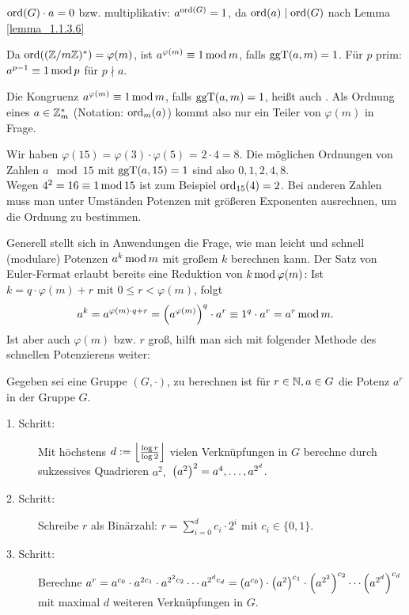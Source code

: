 \begin{folg}
	$\ord(G) \cdot a = 0$ bzw. multiplikativ: $a^{\ord(G)} = 1$, da $\ord(a) \mid \ord(G)$ nach Lemma \ref{lemma_1.1.3.6}
\end{folg}

\begin{folg}
	Da $\ord((\ZZ/m\ZZ)^*) = \varphi(m)$, ist $a^{\varphi(m)} \kon 1 \modu m$, falls $\ggT(a,m)=1$. Für $p$ prim: $a^{p-1} \kon 1 \modu p$ für $p \nmid a$. 
\end{folg}

\begin{bem}
	Die Kongruenz $a^{\varphi(m)} \kon 1 \modu m$, falls $\ggT(a,m)=1$, heißt auch . Als Ordnung eines $a \in \ZZ_m^*$ (Notation: $\ord_m(a)$) kommt also nur ein Teiler von $\varphi(m)$ in Frage.
\end{bem}

\begin{bsp}
	Wir haben $\varphi(15) = \varphi(3) \cdot \varphi(5)$ = $2 \cdot 4 = 8$. Die möglichen Ordnungen von Zahlen $a \mod 15$ mit $\ggT(a,15)=1$  sind also $0,1,2,4,8$.\\
	Wegen $4^2 = 16 \kon 1 \modu 15$ ist zum Beispiel $\ord_{15}(4) = 2$. Bei anderen Zahlen muss man unter Umständen Potenzen mit größeren Exponenten ausrechnen, um die Ordnung zu bestimmen.
\end{bsp}

Generell stellt sich in Anwendungen die Frage, wie man leicht und schnell (modulare) Potenzen $a^k \modu m$ mit großem $k$ berechnen kann. Der Satz von Euler-Fermat erlaubt bereits eine Reduktion von $k \modu \varphi(m)$: Ist\linebreak
$k = q \cdot \varphi(m) + r$ mit $0 \leq r < \varphi(m)$, folgt
\[ a^k = a^{\varphi(m) \cdot q + r} = \enbrace*{a^{\varphi(m)}}^q \cdot a^r \kon 1^q \cdot a^r = a^r \modu m.\]
Ist aber auch $\varphi(m)$ bzw. $r$ groß, hilft man sich mit folgender Methode des schnellen Potenzierens weiter:

\begin{lemma}
	Gegeben sei eine Gruppe $(G,\cdot)$, zu berechnen ist für $r \in \NN, a \in G$ die Potenz $a^r$ in der Gruppe $G$. \begin{description}
		\item[1. Schritt:] Mit höchstens $d := \floor*{\frac{\log r}{\log 2}}$ vielen Verknüpfungen in $G$ berechne durch sukzessives Quadrieren $a^2,$\linebreak
		$\enbrace*{a^2}^2 = a^4, \dots, a^{2^d}$.
		\item[2. Schritt:] Schreibe $r$ als Binärzahl: $r = \sum_{i=0}^d c_i \cdot 2^i$ mit $c_i \in \{0,1\}$.
		\item[3. Schritt:] Berechne $a^r = a^{c_0} \cdot a^{2c_1} \cdot a^{2^2 c_2} \cdots a^{2^d c_d} = \enbrace*{a^{c_0}} \cdot \enbrace*{a^2}^{c_1} \cdot \enbrace*{a^{2^2}}^{c_2} \cdots \enbrace*{a^{2^d}}^{c_d}$ mit maximal $d$ weiteren Verknüpfungen in $G$. 
		\end{description}
\end{lemma}

